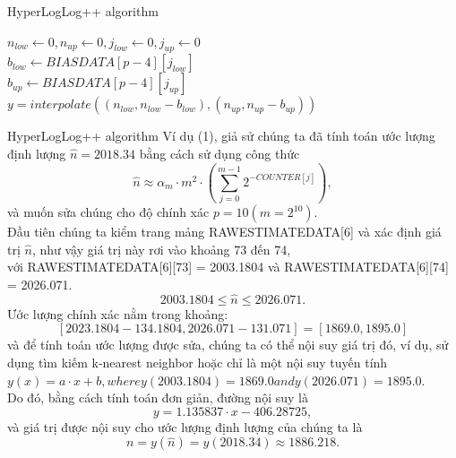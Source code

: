 \documentclass[10pt]{beamer}
\begin{document}
\begin{frame}{HyperLogLog++ algorithm}
  \begin{algorithm}[H]
    \vspace{0.25cm}
    \DontPrintSemicolon
    \LinesNumberedHidden
    \caption[]{Correcting bias in \textit{HyperLogLog++}}
    $n_{low} \gets 0, n_{up} \gets 0, j_{low} \gets 0, j_{up} \gets 0 $\\
    $b_{low} \gets BIASDATA[p-4][j_{low}]$\\
    $b_{up} \gets BIASDATA[p-4][j_{up}]$\\
    $y = interpolate\left(\left(n_{low}, n_{low} - b_{low}\right), \left(n_{up}, n_{up} - b_{up
    }\right)\right)$\\
    \vspace{0.25cm}
\end{algorithm}
\end{frame}
\begin{frame}{HyperLogLog++ algorithm}
  Ví dụ (1), giả sử chúng ta đã tính toán ước lượng định lượng $\hat{n} = 2018.34$ bằng cách sử dụng công thức
  \[
  \hat{n} \approx \alpha_m \cdot m^2 \cdot \left(\sum_{j=0}^{m-1}2^{-COUNTER[j]}\right),
  \]
  và muốn sửa chúng cho 
  độ chính xác $p = 10 (m = 2^{10})$.\\
  Đầu tiên chúng ta kiểm trang mảng RAWESTIMATEDATA[6] và xác định giá trị $\hat{n}$, như vậy giá trị này rơi vào khoảng 73 đến 74,\\ với RAWESTIMATEDATA[6][73] = 2003.1804 và
  RAWESTIMATEDATA[6][74] = 2026.071.
  \[2003.1804 \le \hat{n} \le 2026.071.\]
  Ước lượng chính xác nằm trong khoảng:
  \[\left[2023.1804 - 134.1804, 2026.071 - 131.071\right] = \left[1869.0, 1895.0\right]\]
  và để tính toán ước lượng được sửa, chúng ta có thể nội suy giá trị đó, ví dụ, sử dụng tìm kiếm k-nearest neighbor hoặc chỉ là một nội suy tuyến tính\\
  \newpage
  $y(x) = a \cdot x + b, where y(2003.1804) = 1869.0 and y(2026.071) = 1895.0.$\\
  Do đó, bằng cách tính toán đơn giản, đường nội suy là
  \[y = 1.135837 \cdot x - 406.28725,\]
  và giá trị được nội suy cho ước lượng định lượng của chúng ta là
  \[n = y(\hat{n}) = y(2018.34) \approx 1886.218.\]
\end{frame}
\end{document}
